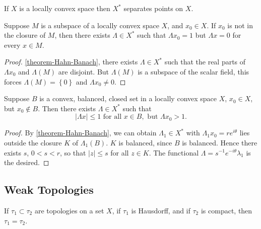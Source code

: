 \begin{corollary}
  \label{corollary-seperating-points}
  If \( X \) is a locally convex space then \( X^* \) separates points on \( X \).
\end{corollary}

\begin{theorem}
  \label{theorem-separating-subspace-and-point}
  Suppose \( M \) is a subspace of a locally convex space \( X \), and \( x_0 \in X \).
  If \( x_0 \) is not in the closure of \( M \), then there exists \( \Lambda \in X^* \) such that \( \Lambda x_0 = 1 \) but \( \Lambda x = 0 \) for every \( x \in M \).
\end{theorem}
\begin{proof}
  \ref{theorem-Hahn-Banach}, there exists \( \Lambda \in X^* \) such that the real parts of \( \Lambda x_0 \) and \( \Lambda(M) \) are disjoint.
  But \( \Lambda(M) \) is a subspace of the scalar field, this forces \( \Lambda(M) = \left\lbrace 0 \right\rbrace \) and \( \Lambda x_0 \neq 0 \).
\end{proof}

\begin{theorem}
  \label{theorem-separating-closed-set-and-point}
  Suppose \( B \) is a convex, balanced, closed set in a locally convex space \( X \), \( x_0 \in X \), but \( x_0 \notin B \).
  Then there exists \( \Lambda \in X^* \) such that
  \[
    \left\lvert \Lambda x \right\rvert \leq 1 \text{ for all } x \in B, \text{ but } \Lambda x_0 > 1.
  \]
\end{theorem}
\begin{proof}
  By \ref{theorem-Hahn-Banach}, we can obtain \( \Lambda_1 \in X^* \) with \( \Lambda_1 x_0 = r e^{i \theta} \) lies outside the closure \( K \) of \( \Lambda_1(B) \).
  \( K \) is balanced, since \( B \) is balanced.
  Hence there exists \( s \), \( 0 < s < r \), so that \( \left\lvert z \right\rvert \leq s \) for all \( z \in K \).
  The functional \( \Lambda = s^{-1} e^{-i \theta} \lambda_1 \) is the desired.
\end{proof}

\subsection{Weak Topologies}
\label{subsection-weak-topologies}

\begin{theorem}
  \label{theorem-compare-topologies}
  If \( \tau_1 \subset \tau_2 \) are topologies on a set \( X \), if \( \tau_1 \) is Hausdorff, and if \( \tau_2 \) is compact, then \( \tau_1 = \tau_2 \).
\end{theorem}

